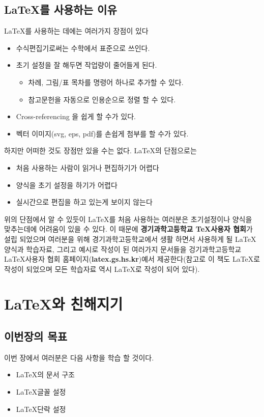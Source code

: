\documentclass[12pt]{article}
\begin{document}
	\subsection{\LaTeX 를 사용하는 이유}
	\LaTeX 를 사용하는 데에는 여러가지 장점이 있다
	\begin{itemize}
		\item 수식편집기로써는 수학에서 표준으로 쓰인다.
		\item 초기 설정을 잘 해두면 작업량이 줄어들게 된다.
		\begin{itemize}
			\item 차례, 그림/표 목차를 명령어 하나로 추가할 수 있다.
			\item 참고문헌을 자동으로 인용순으로 정렬 할 수 있다.
		\end{itemize}
		\item Cross-referencing 을 쉽게 할 수가 있다.
		\item 벡터 이미지(svg, eps, pdf)를 손쉽게 첨부를 할 수가 있다.
	\end{itemize}
	하지만 어떠한 것도 장점만 있을 수는 없다. \LaTeX 의 단점으로는
	\begin{itemize}
		\item 처음 사용하는 사람이 읽거나 편집하기가 어렵다
		\item 양식을 초기 설정을 하기가 어렵다
		\item 실시간으로 편집을 하고 있는게 보이지 않는다
	\end{itemize}
	위의 단점에서 알 수 있듯이 \LaTeX 를 처음 사용하는 여러분은 초기설정이나 양식을 맞추는데에 어려움이 있을 수 있다. 이 때문에 {\bf 경기과학고등학교 \TeX 사용자 협회}가 설립 되었으며  여러분을 위해 경기과학고등학교에서 생활 하면서 사용하게 될 \LaTeX 양식과 학습자료, 그리고 예시로 작성이 된 여러가지 문서들을 겅기과학고등학교 \LaTeX 사용자 협회 홈페이지({\bf latex.gs.hs.kr})예서 제공한다(참고로 이 책도 \LaTeX 로 작성이 되었으며 모든 학습자료 역시 \LaTeX 로 작성이 되어 있다).
	\clearpage
	
	\section{\LaTeX 와 친해지기}
	\subsection{이번장의 목표}
	이번 장에서 여러분은 다음 사항을 학습 할 것이다.
	\begin{itemize}
		\item \LaTeX 의 문서 구조
		\item \LaTeX 글꼴 설정
		\item \LaTeX 단락 설정
	\end{itemize}
\end{document}
